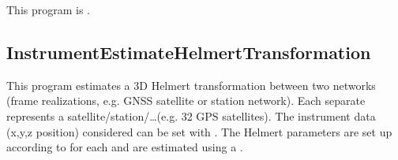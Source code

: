 This program is .
\clearpage
\subsection{InstrumentEstimateHelmertTransformation}\label{InstrumentEstimateHelmertTransformation}
This program estimates a 3D Helmert transformation between two networks
(frame realizations, e.g. GNSS satellite or station network).
Each separate  represents a satellite/station/\ldots (e.g. 32 GPS satellites).
The instrument data (x,y,z position) considered can be set with .
The Helmert parameters are set up according to 
for each  and are estimated using a
.



